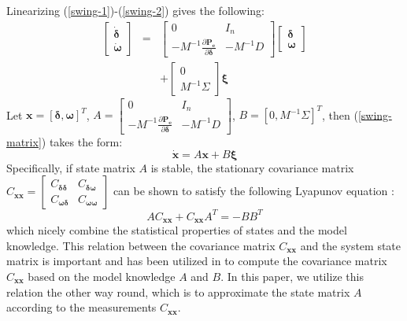 \documentclass[journal]{IEEEtran}
\begin{document}
Linearizing (\ref{swing-1})-(\ref{swing-2}) gives the following:
\begin{eqnarray}
\left[\begin{array}{c}\dot{\bm{\delta}}\\\dot{\bm{\omega}}\end{array}\right]&=&
\left[\begin{array}{cc}{{0}}&{I_n}\\-M^{-1}\frac{\partial{\bm{P_e}}}{\partial{\bm{\delta}}}&-M^{-1}D\end{array}\right]
\left[\begin{array}{c}{\bm{\delta}}\\{\bm{\omega}}\end{array}\right]\nonumber\\
&&+\left[\begin{array}{c}0\\M^{-1}\Sigma\end{array}\right]\bm{\xi}\label{swing-matrix}
\end{eqnarray}
Let $\bm{x}=[\bm{\delta},\bm{\omega}]^T$, $A=\left[\begin{array}{cc}{{0}}&{I_n}\\-M^{-1}\frac{\partial{\bm{P_e}}}{\partial{\bm{\delta}}}&-M^{-1}D\end{array}\right]$, $B=[0,M^{-1}\Sigma]^T$, then (\ref{swing-matrix}) takes the form:
\begin{equation}
\dot{\bm{x}}=A\bm{x}+B\bm{\xi}
\end{equation}
Specifically, if state matrix $A$ is stable, the stationary covariance matrix $C_{\bm{x}\bm{x}}=\left[\begin{array}{cc}C_{\bm{\delta}{\bm{\delta}}}&C_{\bm{\delta}{\bm{\omega}}}\\C_{\bm{\omega}{\bm{\delta}}}&C_{\bm{\omega}{\bm{\omega}}}\end{array}\right]$ can be shown to satisfy the following Lyapunov equation \cite{Hines:2015}\cite{Gardiner:2009}:
\begin{equation}
AC_{\bm{x}\bm{x}}+C_{\bm{x}\bm{x}}A^T=-BB^T \label{lyapunov}
\end{equation}
which nicely combine the statistical properties of states and the model knowledge.
This relation between the covariance matrix $C_{\bm{x}\bm{x}}$ and the system state matrix is important and has been utilized in \cite{Hines:2015} to compute the covariance matrix $C_{\bm{x}\bm{x}}$ based on the model knowledge $A$ and $B$. In this paper, we utilize this relation the other way round, which is to approximate the state matrix $A$ according to the measurements $C_{\bm{x}\bm{x}}$.
\end{document}

